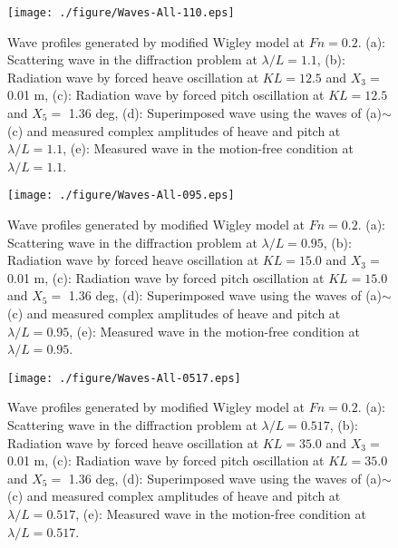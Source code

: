\documentclass[11pt,fleqn,a3]{article}
\begin{document}
\begin{figure}[thb]%
\bc
\texttt{[image: ./figure/Waves-All-110.eps]}
\ec
\par\vspace*{-4mm}
\caption{Wave profiles generated by modified Wigley model at $Fn=0.2$.
(a): Scattering wave in the diffraction problem at $\lambda /L=1.1$, 
(b): Radiation wave by forced heave oscillation at $KL=12.5$ and $X_3=$ 0.01 m,
(c): Radiation wave by forced pitch oscillation at $KL=12.5$ and $X_5=$ 1.36 deg,
(d): Superimposed wave using the waves of (a)$\sim$(c) and measured complex 
amplitudes of heave and pitch at $\lambda /L=1.1$,
(e): Measured wave in the motion-free condition at $\lambda /L=1.1$.} \label{fig06}

\end{figure}


\begin{figure}[thb]%
\bc
\texttt{[image: ./figure/Waves-All-095.eps]}
\ec
\par\vspace*{-4mm}
\caption{Wave profiles generated by modified Wigley model at $Fn=0.2$.
(a): Scattering wave in the diffraction problem at $\lambda /L=0.95$, 
(b): Radiation wave by forced heave oscillation at $KL=15.0$ and $X_3=$ 0.01 m,
(c): Radiation wave by forced pitch oscillation at $KL=15.0$ and $X_5=$ 1.36 deg,
(d): Superimposed wave using the waves of (a)$\sim$(c) and measured complex 
amplitudes of heave and pitch at $\lambda /L=0.95$,
(e): Measured wave in the motion-free condition at $\lambda /L=0.95$.} \label{fig07}

\end{figure}


\begin{figure}[thb]%
\bc
\texttt{[image: ./figure/Waves-All-0517.eps]}
\ec
\par\vspace*{-4mm}
\caption{Wave profiles generated by modified Wigley model at $Fn=0.2$.
(a): Scattering wave in the diffraction problem at $\lambda /L=0.517$, 
(b): Radiation wave by forced heave oscillation at $KL=35.0$ and $X_3=$ 0.01 m,
(c): Radiation wave by forced pitch oscillation at $KL=35.0$ and $X_5=$ 1.36 deg,
(d): Superimposed wave using the waves of (a)$\sim$(c) and measured complex 
amplitudes of heave and pitch at $\lambda /L=0.517$,
(e): Measured wave in the motion-free condition at $\lambda /L=0.517$.} \label{fig08}

\end{figure}
\end{document}
